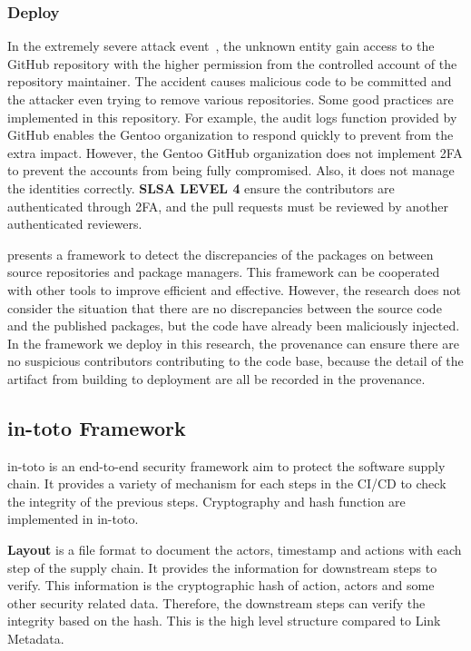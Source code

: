 \subsubsection{Deploy}
In the extremely severe attack event~\cite{gentoo-incident-report}, 
the unknown entity gain access to the GitHub repository with the higher permission from the controlled
account of the repository maintainer. The accident causes malicious code to be committed and the
attacker even trying to remove various repositories. Some good practices are implemented
in this repository. For example, the audit logs function provided by GitHub enables the Gentoo organization
to respond quickly to prevent from the extra impact. However, the Gentoo GitHub organization does not
implement 2FA to prevent the accounts from being fully compromised. Also, it does not manage the identities
correctly. \textbf{SLSA LEVEL 4} ensure the contributors are authenticated through 2FA, and the pull requests
must be reviewed by another authenticated reviewers.

\cite{vu2021lastpymile} presents a framework to detect the discrepancies of the packages on 
between source repositories and package managers. This framework can be cooperated with other tools to improve
efficient and effective. However, the research does not consider the situation that there are no
discrepancies between the source code and the published packages, but the code have already been maliciously injected.
In the framework we deploy in this research, the provenance can ensure there are no suspicious contributors contributing
to the code base, because the detail of the artifact from building to deployment are all be recorded in the provenance.



\subsection{in-toto Framework}
in-toto is an end-to-end security framework aim to protect the software supply chain. It provides a variety
of mechanism for each steps in the CI/CD to check the integrity of the previous steps. Cryptography and hash 
function are implemented in in-toto.

\textbf{Layout} is a file format to document the actors, timestamp and actions with each step of the supply chain.
It provides the information for downstream steps to verify. This information is the cryptographic hash of action, actors and some other security
related data. Therefore, the downstream steps can verify the integrity based on the hash. This is the high level structure 
compared to Link Metadata.

